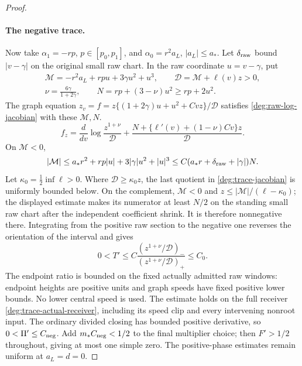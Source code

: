 \begin{proof}
\paragraph{The negative trace.}
Now take \(\alpha_1=-rp\), \(p\in[p_0,p_1]\), and
\(\alpha_0=r^2a_L\), \(|a_L|\le a_*\). Let \(\delta_{\rm raw}\)
bound \(|v-\gamma|\) on the original small raw chart. In the raw coordinate
\(u=v-\gamma\), put
\[
 \begin{gathered}
 \mathcal M=-r^2a_L+rpu+3\gamma u^2+u^3,\qquad
 \mathscr D=\mathcal M+\ell(v)z>0,\\
 \nu=\frac{6\gamma}{1+2\gamma},\qquad N=rp+(3-\nu)u^2\ge rp+2u^2.
 \end{gathered}
\]
The graph equation
\(z_v=f=z\{(1+2\gamma)u+u^2+Cvz\}/\mathscr D\)
satisfies \eqref{deg:raw-log-jacobian} with these \(\mathcal M,N\).
\begin{equation}\label{deg:trace-jacobian}
 f_z=\frac d{dv}\log\frac{z^{1+\nu}}{\mathscr D}
   +\frac{N+\{\ell'(v)+(1-\nu)Cv\}z}{\mathscr D}.
\end{equation}
On \(\mathcal M<0\),
\[
 |\mathcal M|\le a_*r^2+rp|u|+3|\gamma|u^2+|u|^3
 \le C(a_*r+\delta_{\rm raw}+|\gamma|)N.
\]
Let \(\kappa_0=\tfrac12\inf\ell>0\).  Where
\(\mathscr D\ge\kappa_0z\), the last quotient in
\eqref{deg:trace-jacobian} is uniformly bounded below.
On the complement, \(\mathcal M<0\) and
\(z\le|\mathcal M|/(\ell-\kappa_0)\); the displayed estimate
makes its numerator at least \(N/2\) on the standing small raw chart
after the independent coefficient shrink.  It is therefore nonnegative there.
Integrating from the positive raw section to the negative one
reverses the orientation of the interval and gives
\begin{equation}\label{deg:trace-negative-derivative}
 0<T'\le C\frac{(z^{1+\nu}/\mathscr D)_-}
 {(z^{1+\nu}/\mathscr D)_+}\le C_0.
\end{equation}
The endpoint ratio is bounded on the fixed actually admitted raw
windows: endpoint heights are positive units and graph speeds have
fixed positive lower bounds. No lower central speed is used. The
estimate holds on the full receiver \eqref{deg:trace-actual-receiver},
including its speed clip and every intervening nonroot input.
The ordinary divided closing has bounded positive derivative, so
\(0<\Pi'\le C_{\rm neg}\). Add \(m_*C_{\rm neg}<1/2\) to the final
multiplier choice; then \(F'>1/2\) throughout, giving at most one
simple zero. The positive-phase estimates remain uniform at \(a_L=d=0\).
\end{proof}
